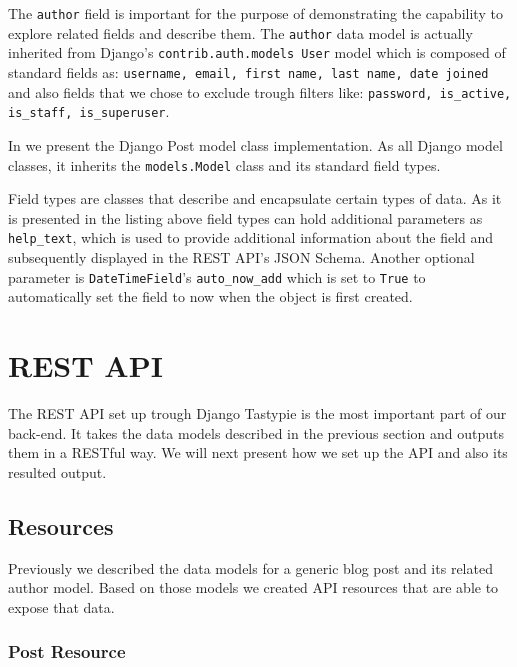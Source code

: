 The \texttt{author} field is important for the purpose of demonstrating the capability to explore related fields and describe them. The \texttt{author} data model is actually inherited from Django's \texttt{contrib.auth.models User} model which is composed of standard fields as: \texttt{username, email, first name, last name, date joined} and also fields that we chose to exclude trough filters like: \texttt{password, is\_active, is\_staff, is\_superuser}.

In  we present the Django Post model class implementation. As all Django model classes, it inherits the \texttt{models.Model} class and its standard field types.



Field types are classes that describe and encapsulate certain types of data. As it is presented in the listing above field types can hold additional parameters as \texttt{help\_text}, which is used to provide additional information about the field and subsequently displayed in the REST API's JSON Schema. Another optional parameter is \texttt{DateTimeField}'s \texttt{auto\_now\_add} which is set to \texttt{True} to automatically set the field to now when the object is first created.
		

\section{REST API}
\label{sec:api}

The REST API set up trough Django Tastypie is the most important part of our back-end. It takes the data models described in the previous section and outputs them in a RESTful way. We will next present how we set up the API and also its resulted output.

\subsection{Resources}
\label{sub-sec:resources}

Previously we described the data models for a generic blog post and its related author model. Based on those models we created API resources that are able to expose that data.

\subsubsection{Post Resource}
\label{sub-sub-sec:post-resource}

